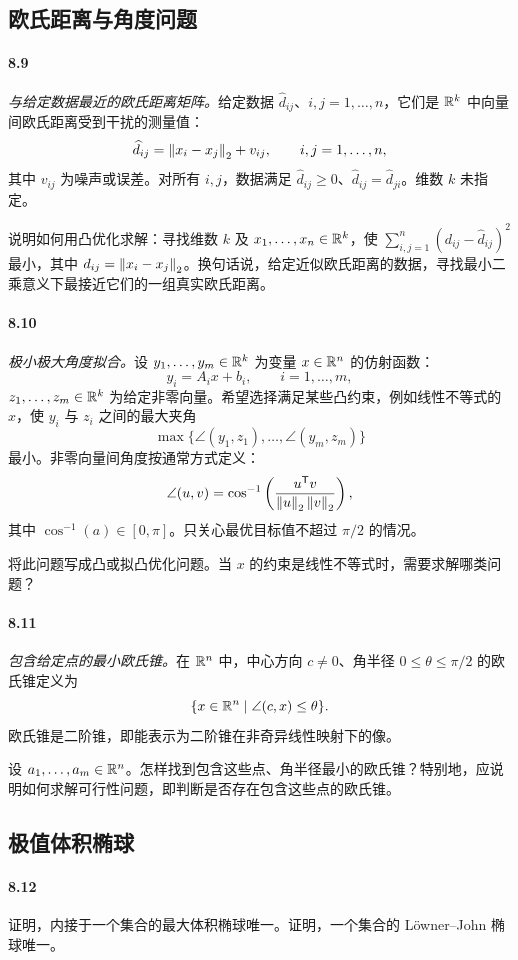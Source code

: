 \subsection*{欧氏距离与角度问题}
\paragraph{8.9}\textit{与给定数据最近的欧氏距离矩阵。}给定数据 $\widehat d_{ij}$、$i,j=1,\ldots,n$，它们是 $\mathbb R^k$ 中向量间欧氏距离受到干扰的测量值：
\[\widehat d_{ij}=\left\lVert x_i-x_j\right\rVert_2+v_{ij},\qquad i,j=1,\ldots,n,\]
其中 $v_{ij}$ 为噪声或误差。对所有 $i,j$，数据满足 $\widehat d_{ij}\geq0$、$\widehat d_{ij}=\widehat d_{ji}$。维数 $k$ 未指定。

说明如何用凸优化求解：寻找维数 $k$ 及 $x_1,\ldots,x_n\in\mathbb R^k$，使 $\sum_{i,j=1}^n(d_{ij}-\widehat d_{ij})^2$ 最小，其中 $d_{ij}=\left\lVert x_i-x_j\right\rVert_2$。换句话说，给定近似欧氏距离的数据，寻找最小二乘意义下最接近它们的一组真实欧氏距离。
\paragraph{8.10}\textit{极小极大角度拟合。}设 $y_1,\ldots,y_m\in\mathbb R^k$ 为变量 $x\in\mathbb R^n$ 的仿射函数：
\[y_i=A_ix+b_i,\qquad i=1,\ldots,m,\]
$z_1,\ldots,z_m\in\mathbb R^k$ 为给定非零向量。希望选择满足某些凸约束，例如线性不等式的 $x$，使 $y_i$ 与 $z_i$ 之间的最大夹角
\[\max\{\angle(y_1,z_1),\ldots,\angle(y_m,z_m)\}\]
最小。非零向量间角度按通常方式定义：
\[\angle(u,v)=\cos^{-1}\left(\frac{u^\mathsf T v}{\left\lVert u\right\rVert_2\left\lVert v\right\rVert_2}\right),\]
其中 $\cos^{-1}(a)\in[0,\pi]$。只关心最优目标值不超过 $\pi/2$ 的情况。

将此问题写成凸或拟凸优化问题。当 $x$ 的约束是线性不等式时，需要求解哪类问题？
\paragraph{8.11}\textit{包含给定点的最小欧氏锥。}在 $\mathbb R^n$ 中，中心方向 $c\ne0$、角半径 $0\leq\theta\leq\pi/2$ 的欧氏锥定义为
\[\{x\in\mathbb R^n\mid\angle(c,x)\leq\theta\}.\]
欧氏锥是二阶锥，即能表示为二阶锥在非奇异线性映射下的像。

设 $a_1,\ldots,a_m\in\mathbb R^n$。怎样找到包含这些点、角半径最小的欧氏锥？特别地，应说明如何求解可行性问题，即判断是否存在包含这些点的欧氏锥。
\subsection*{极值体积椭球}
\paragraph{8.12}证明，内接于一个集合的最大体积椭球唯一。证明，一个集合的 Löwner--John 椭球唯一。
